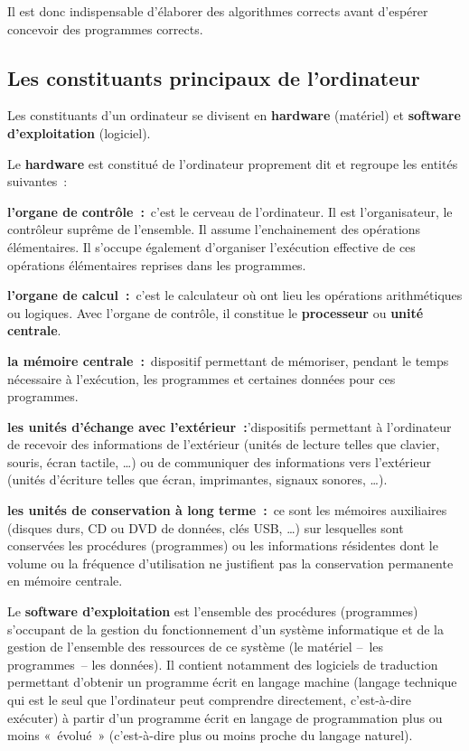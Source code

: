 		Il est donc indispensable d’élaborer des algorithmes corrects avant
		d’espérer concevoir des programmes corrects.

	\subsection{Les constituants principaux de l’ordinateur}

		Les constituants d’un ordinateur se divisent en \textbf{hardware}
		(matériel) et \textbf{software d’exploitation} (logiciel).
		
		Le \textbf{hardware} est constitué de l’ordinateur proprement dit et
		regroupe les entités suivantes~:

		\begin{liste}
		\item
			\textbf{l’organe de contrôle~:}~c’est le cerveau de
			l’ordinateur. Il est l’organisateur, le contrôleur
			suprême de l’ensemble. Il assume l’enchainement des opérations
			élémentaires. Il s’occupe également d’organiser l’exécution effective
			de ces opérations élémentaires reprises dans les programmes.
		\item
			\textbf{l’organe de calcul~:}~c’est le calculateur où ont lieu les
			opérations arithmétiques ou logiques. Avec l’organe de contrôle, il
			constitue le \textbf{processeur} ou \textbf{unité centrale}.
		\item
			\textbf{la mémoire centrale~:}~dispositif permettant de mémoriser,
			pendant le temps nécessaire à l’exécution, les programmes et certaines
			données pour ces programmes.
		\item
			\textbf{les unités d’échange avec l’extérieur~:}’dispositifs permettant
			à l’ordinateur de recevoir des informations de l’extérieur (unités de
			lecture telles que clavier, souris, écran tactile, \dots) ou de
			communiquer des informations vers l’extérieur (unités d’écriture telles
			que écran, imprimantes, signaux sonores, \dots).
		\item
			\textbf{les unités de conservation à long terme~:}~ce sont les mémoires
			auxiliaires (disques durs, CD ou DVD de données, clés USB, \dots) sur
			lesquelles sont conservées les procédures (programmes) ou les
			informations résidentes dont le volume ou la fréquence d’utilisation ne
			justifient pas la conservation permanente en mémoire centrale.
		\end{liste}
		
		Le \textbf{software d’exploitation} est l’ensemble des procédures
		(programmes) s’occupant de la gestion du fonctionnement d’un système
		informatique et de la gestion de l’ensemble des ressources de ce
		système (le matériel –~les programmes~– les données). Il contient
		notamment des logiciels de traduction permettant d’obtenir un programme
		écrit en langage machine (langage technique qui est le seul que
		l’ordinateur peut comprendre directement, c’est-à-dire exécuter) à
		partir d’un programme écrit en langage de programmation plus ou moins
		«~évolué~» (c’est-à-dire plus ou moins proche du langage naturel).

